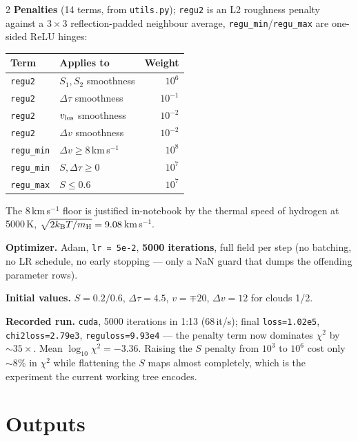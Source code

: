 \documentclass[9pt,a4paper]{article}
\newcommand{\co}[1]{{\small\texttt{#1}}}
\begin{document}
\begin{multicols}{2}
\textbf{Penalties} (14 terms, from \co{utils.py}); \co{regu2} is an L2 roughness penalty against a $3\times3$ reflection-padded neighbour average, \co{regu\_min}/\co{regu\_max} are one-sided ReLU hinges:

\vspace{2pt}
{\footnotesize
\begin{tabular}{@{}llr@{}}
\toprule
\textbf{Term} & \textbf{Applies to} & \textbf{Weight} \\
\midrule
\co{regu2}    & $S_1,S_2$ smoothness      & $10^{6}$ \\
\co{regu2}    & $\Delta\tau$ smoothness   & $10^{-1}$ \\
\co{regu2}    & $v_{\rm los}$ smoothness  & $10^{-2}$ \\
\co{regu2}    & $\Delta v$ smoothness     & $10^{-2}$ \\
\co{regu\_min}& $\Delta v\ge 8$\,km\,s$^{-1}$ & $10^{8}$ \\
\co{regu\_min}& $S,\Delta\tau\ge 0$       & $10^{7}$ \\
\co{regu\_max}& $S\le 0.6$                & $10^{7}$ \\
\bottomrule
\end{tabular}}
\vspace{2pt}

The 8\,km\,s$^{-1}$ floor is justified in-notebook by the thermal speed of hydrogen at 5000\,K, $\sqrt{2k_{\rm B}T/m_{\rm H}}=9.08$\,km\,s$^{-1}$.

\textbf{Optimizer.} Adam, \co{lr\,=\,5e-2}, \textbf{5000 iterations}, full field per step (no batching, no LR schedule, no early stopping --- only a NaN guard that dumps the offending parameter rows).

\textbf{Initial values.} $S=0.2/0.6$, $\Delta\tau=4.5$, $v=\mp20$, $\Delta v=12$ for clouds 1/2.

\textbf{Recorded run.} \co{cuda}, 5000 iterations in 1:13 (68\,it/s); final \co{loss=1.02e5}, \co{chi2loss=2.79e3}, \co{reguloss=9.93e4} --- the penalty term now dominates $\chi^2$ by ${\sim}35\times$. Mean $\log_{10}\chi^2=-3.36$. Raising the $S$ penalty from $10^3$ to $10^6$ cost only ${\sim}8\%$ in $\chi^2$ while flattening the $S$ maps almost completely, which is the experiment the current working tree encodes.

\section{Outputs}


\end{multicols}
\end{document}
